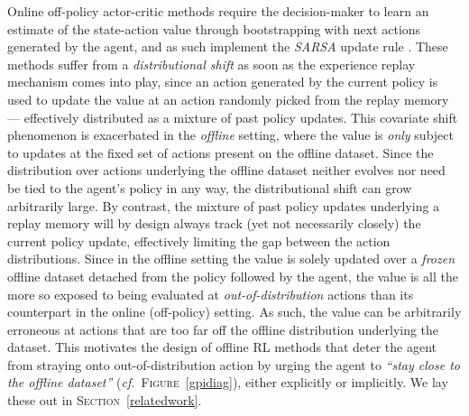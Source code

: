 Online off-policy actor-critic methods
require the decision-maker to learn an estimate of the state-action value
through bootstrapping with next actions generated by the agent,
and as such implement the \textit{SARSA} update rule
\cite{Rummery1994-qp, Thrun1995-sz, Sutton1996-ky, Van_Seijen2009-yw}.
These methods suffer from a \emph{distributional shift} \cite{Fu2019-kb}
as soon as the experience replay \cite{Lin1993-qe}
mechanism comes into play, since an action generated by the current policy
is used to update the value at an action randomly picked from the replay memory --- effectively
distributed as a mixture of past policy updates.
This covariate shift phenomenon is exacerbated in the \emph{offline} setting,
where the value is \emph{only} subject to updates at the fixed set of actions present on the offline dataset.
Since the distribution over actions underlying the offline dataset neither evolves nor need be tied to the
agent's policy in any way, the distributional shift can grow arbitrarily large. By contrast,
the mixture of past policy updates underlying a replay memory will by design
always track (yet not necessarily closely) the current policy update, effectively limiting the
gap between the action distributions.
Since
in the offline setting
the value is solely updated over a \emph{frozen} offline dataset detached from the policy
followed by the agent, the value is all the more so exposed to being evaluated at \emph{out-of-distribution} actions
than its counterpart in the online (off-policy) setting.
As such, the value can be arbitrarily erroneous at actions that are
too far off the offline distribution underlying the dataset.
This motivates the design of offline RL methods that
deter the agent from straying onto out-of-distribution action
by urging the agent to \textit{``stay close to the offline dataset''} (\textit{cf.}~\textsc{Figure}~\ref{gpidiag}),
either explicitly or implicitly.
We lay these out in \textsc{Section}~\ref{relatedwork}.

